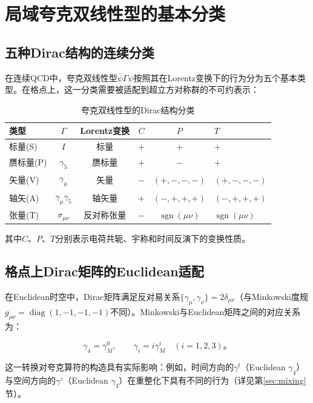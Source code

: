 \documentclass[12pt,a4paper]{ctexart}
\theoremstyle{definition}
\begin{document}
\section{局域夸克双线性型的基本分类}

\subsection{五种Dirac结构的连续分类}

在连续QCD中，夸克双线性型$\bar{\psi}\Gamma\psi$按照其在Lorentz变换下的行为分为五个基本类型。在格点上，这一分类需要被适配到超立方对称群的不可约表示：

\begin{table}[H]
\centering
\caption{夸克双线性型的Dirac结构分类}
\label{tab:bilinear_classification}
\begin{tabular}{lccccl}
\toprule
类型 & $\Gamma$ & Lorentz变换 & $C$ & $P$ & $T$ \\
\midrule
标量(S)   & $I$           & 标量     & $+$ & $+$ & $+$ \\
赝标量(P) & $\gamma_5$    & 赝标量   & $+$ & $-$ & $+$ \\
矢量(V)   & $\gamma_\mu$  & 矢量     & $-$ & $(+,-,-,-)$ & $(+,-,-,-)$ \\
轴矢(A)   & $\gamma_\mu\gamma_5$ & 轴矢量 & $+$ & $(-,+,+,+)$ & $(-,+,+,+)$ \\
张量(T)   & $\sigma_{\mu\nu}$ & 反对称张量 & $-$ & $\operatorname{sgn}(\mu\nu)$ & $\operatorname{sgn}(\mu\nu)$ \\
\bottomrule
\end{tabular}
\end{table}

其中$C$、$P$、$T$分别表示电荷共轭、宇称和时间反演下的变换性质。

\subsection{格点上Dirac矩阵的Euclidean适配}

在Euclidean时空中，Dirac矩阵满足反对易关系$\{\gamma_\mu, \gamma_\nu\} = 2\delta_{\mu\nu}$（与Minkowski度规$g_{\mu\nu} = \operatorname{diag}(1,-1,-1,-1)$不同）。Minkowski与Euclidean矩阵之间的对应关系为\cite{Liu2019isovector}：

\begin{equation}
\gamma_4 = \gamma^0_M, \qquad \gamma_i = i\gamma^i_M \quad (i = 1,2,3)。
\end{equation}

这一转换对夸克算符的构造具有实际影响：例如，时间方向的$\gamma^t$（Euclidean $\gamma_4$）与空间方向的$\gamma^z$（Euclidean $\gamma_3$）在重整化下具有不同的行为（详见第\ref{sec:mixing}节）。
\end{document}
